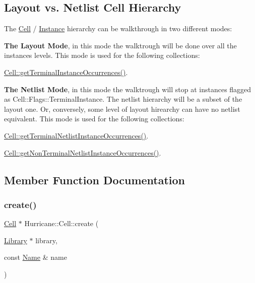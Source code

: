 \hypertarget{classHurricane_1_1Cell_secCellHierarchy}{}\subsection{Layout vs. Netlist Cell Hierarchy}\label{classHurricane_1_1Cell_secCellHierarchy}
The \mbox{\hyperlink{classHurricane_1_1Cell}{Cell}} / \mbox{\hyperlink{classHurricane_1_1Instance}{Instance}} hierarchy can be walkthrough in two different modes\+: 
\begin{DoxyItemize}
\item {\bfseries The Layout Mode}, in this mode the walktrough will be done over all the instances levels. This mode is used for the following collections\+: 
\begin{DoxyItemize}
\item \mbox{\hyperlink{classHurricane_1_1Cell_a30b71d9a35ff4e0b59b98ef515f26fc0}{Cell\+::get\+Terminal\+Instance\+Occurrences()}}. 
\end{DoxyItemize}


\item {\bfseries The Netlist Mode}, in this mode the walktrough will stop at instances flagged as Cell\+::\+Flags\+::\+Terminal\+Instance. The netlist hierarchy will be a subset of the layout one. Or, conversely, some level of layout hirearchy can have no netlist equivalent. This mode is used for the following collections\+:


\begin{DoxyItemize}
\item \mbox{\hyperlink{classHurricane_1_1Cell_a6f559f7dab6e4afc0b60eba064c5e474}{Cell\+::get\+Terminal\+Netlist\+Instance\+Occurrences()}}. 
\item \mbox{\hyperlink{classHurricane_1_1Cell_a9e7a0536ec1efb23be2764068a85b6a7}{Cell\+::get\+Non\+Terminal\+Netlist\+Instance\+Occurrences()}}. 
\end{DoxyItemize}
\end{DoxyItemize}

\subsection{Member Function Documentation}
\mbox{\label{classHurricane_1_1Cell_ad803afb3e52bea3bf3d520e353b162e0}} 
\subsubsection{\texorpdfstring{create()}{create()}}
{\footnotesize\ttfamily \mbox{\hyperlink{classHurricane_1_1Cell}{Cell}} $\ast$ Hurricane\+::\+Cell\+::create (\begin{DoxyParamCaption}\item[{\mbox{\hyperlink{classHurricane_1_1Library}{Library}} $\ast$}]{library,  }\item[{const \mbox{\hyperlink{classHurricane_1_1Name}{Name}} \&}]{name }\end{DoxyParamCaption})\hspace{0.3cm}{\ttfamily [static]}}

